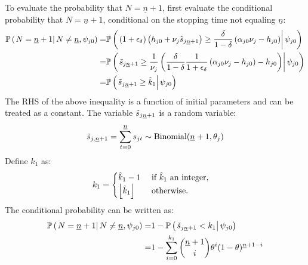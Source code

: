 To evaluate the probability that $N = \underline{n} + 1$, first evaluate the conditional probability that $N = \underline{n} + 1$, conditional on the stopping time not equaling $\underline{n}$:
\begin{align*}
    \PP \pr{\cls{N = \underline{n} + 1}{N \neq \underline{n}, \psi_{j0}}}
    =&
    \PP \pr{\cls{
        \pr{1 + \epsilon_\delta}
        \pr{h_{j0} + \nu_j \ks[\underline{n} + 1]}
        \geq
        \frac{\delta}{1 - \delta}
        \pr{\alpha_{j0} \nu_j - h_{j0}}
    }{\psi_{j0}}}
    \\
    =&
    \PP \pr{\cls{
        \ks[\underline{n} + 1]
        \geq
        \frac{1}{\nu_j}
        \pr{        
            \frac{\delta}{1 - \delta} 
            \frac{1}{1 + \epsilon_\delta}
            \pr{\alpha_{j0} \nu_j - h_{j0}}
            - h_{j0}
        }
    }{\psi_{j0}}}
    \\
    =&
    \PP \pr{\cls{
        \ks[\underline{n} + 1]
        \geq
        \hat{k}_1
    }{\psi_{j0}}}
\end{align*}
The RHS of the above inequality is a function of initial parameters and can be treated as a constant.
The variable $\ks[\underline{n} + 1]$ is a random variable:
\begin{equation*}
    \ks[, \underline{n} + 1] = \sum_{t=0}^{\underline{n}} \pass_{jt} \sim \text{Binomial} (\underline{n} + 1, \theta_j)
\end{equation*}
Define $k_1$ as:
\begin{align*}
    k_1 &= \begin{cases}
    \hat{k}_1 - 1
    &\text{ if $\hat{k}_1$ an integer,}
    \\
    \floor{\hat{k}_1}
    &\text{ otherwise.}
    \end{cases}
\end{align*}
The conditional probability can be written as:
\begin{align*}
    \PP \pr{\cls{N = \underline{n} + 1}{N \neq \underline{n}, \psi_{j0}}}
    =&
    1 
    -
    \PP \pr{\cls{
        \ks[\underline{n} + 1]
        <
        k_1
    }{\psi_{j0}}} 
    \\
    =&
    1 
    - 
    \sum_{i=0}^{k_1}
    \binom{\underline{n} + 1}{i}
    \theta^i
    (1 - \theta)^{\underline{n} + 1 - i}
\end{align*}
